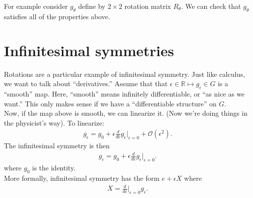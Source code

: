 \documentclass{book}
\theoremstyle{definition}
\newcommand{\f}[2]{\frac{#1}{#2}}
\begin{document}
For example consider $g_\theta$ define by $2\times 2$ rotation matrix $R_\theta$. We can check that $g_\theta$ satisfies all of the properties above.  


























\section{Infinitesimal symmetries}

Rotations are a particular example of infinitesimal symmetry. Just like calculus, we want to talk about ``derivatives.'' Assume that that $\epsilon \in \mathbb{R} \mapsto g_\epsilon \in G$ is a ``smooth'' map. Here, ``smooth'' means infinitely differentiable, or ``as nice as we want.'' This only makes sense if we have a ``differentiable structure'' on $G$. \\

Now, if the map above is smooth, we can linearize it. (Now we're doing things in the physicist's way). To linearize:
\begin{align}
g_\epsilon = g_0 + \epsilon \f{d}{d\epsilon}g_\epsilon\bigg\vert_{\epsilon = 0} + \mathcal{O}(\epsilon^2).
\end{align}
The infinitesimal symmetry is then 
\begin{align}
g_\epsilon = g_0 + \epsilon \f{d}{d\epsilon}g_\epsilon\bigg\vert_{\epsilon = 0}.
\end{align}
where $g_0$ is the identity.\\

More formally, infinitesimal symmetry has the form $e + \epsilon X$ where 
\begin{align}
X = \f{d}{d\epsilon}\bigg\vert_{\epsilon = 0} g_\epsilon.
\end{align}
\end{document}
